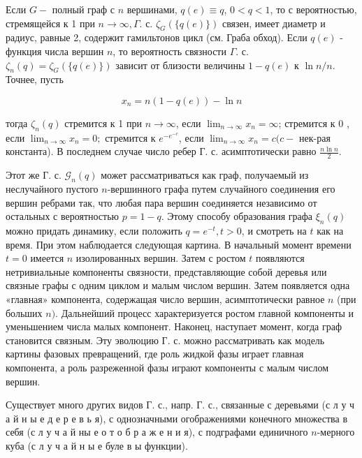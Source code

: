 \documentclass[10pt]{article}
\begin{document}
Если $G-$ полный граф с $n$ вершинами, $q(e) \equiv q$, $0<q<1$, то с вероятностью, стремящейся к 1 при $n \rightarrow \infty, \Gamma$. с. $\mathscr{\zeta}_{G}(\{q(e)\})$ связен, имеет диаметр и радиус, равные 2, содержит гамильтонов цикл (см. Граба обход). Если $q(e)$ - функция числа вершин $n$, то вероятность связности $\Gamma$. с. $\zeta_{n}(q)=\mathscr{\zeta}_{G}(\{q(e)\})$ зависит от близости величины $1-q(e)$ к $\ln n / n$. Точнее, пусть



\[

x_{n}=n(1-q(e))-\ln n

\]



тогда $\mathscr{\zeta}_{n}(q)$ стремится к 1 при $n \rightarrow \infty$, если $\lim _{n \rightarrow \infty} x_{n}=\infty$; стремится к 0 , если $\lim _{n \rightarrow \infty} x_{n}=0 ;$ стремится к $e^{-e^{-c}}$, если $\lim _{n \rightarrow \infty} x_{n}=c(c-$ нек-рая константа). В последнем случае число ребер Г. с. асимптотически равно $\frac{n \ln n}{2}$.



Этот же Г. с. $\mathscr{G}_{n}(q)$ может рассматриваться как граф, получаемый из неслучайного пустого $n$-вершинного графа путем случайного соединения его вершин ребрами так, что любая пара вершин соединяется независимо от остальных с вероятностью $p=1-q$. Этому способу образования графа $\xi_{n}(q)$ можно придать динамику, если положить $q=e^{-t}, t>0$, и смотреть на $t$ как на время. При этом наблюдается следующая картина. В начальный момент времени $t=0$ имеется $n$ изолированных вершин. Затем с ростом $t$ появляются нетривиальные компоненты связности, представляющие собой деревья или связные графы с одним циклом и малым числом вершин. Затем появляется одна «главная» компонента, содержащая число вершин, асимптотически равное $n$ (при больших $n)$. Дальнейший процесс характеризуется ростом главной компоненты и уменьшением числа малых компонент. Наконец, наступает момент, когда граф становится связным. Эту эволюцию Г. с. можно рассматривать как модель картины фазовых превращений, где роль жидкой фазы играет главная компонента, а роль разреженной фазы играют компоненты с малым числом вершин.



Существует много других видов Г. с., напр. Г. с., связанные с деревьями (с л у ч а й н ы е д е р е в ь я), с однозначными огображениями конечного множества в себя (с л у ч а й ны е о т о б р а ж е н и я), с подграфами единичного $n$-мерного куба (с л у ч а й н ы е буле в ы функции).
\end{document}
